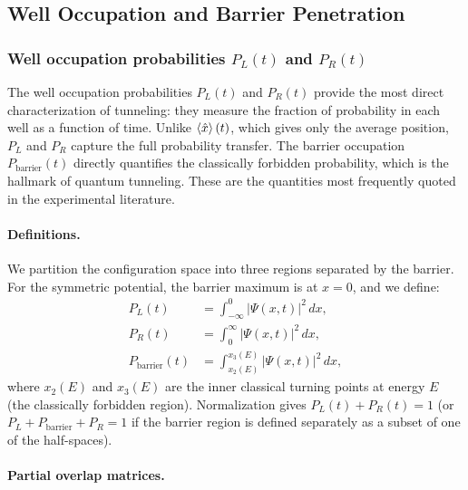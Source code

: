 \subsection{Well Occupation and Barrier Penetration}\label{sec:well_occupation}

\subsubsection{Well occupation probabilities $P_L(t)$ and $P_R(t)$}\label{sec:PLR}

\begin{remark}
The well occupation probabilities $P_L(t)$ and $P_R(t)$ provide the most direct characterization of tunneling: they measure the fraction of probability in each well as a function of time.
Unlike $\expval{\hat{x}}(t)$, which gives only the average position, $P_L$ and $P_R$ capture the full probability transfer.
The barrier occupation $P_{\text{barrier}}(t)$ directly quantifies the classically forbidden probability, which is the hallmark of quantum tunneling.
These are the quantities most frequently quoted in the experimental literature.
\end{remark}

\paragraph{Definitions.}

We partition the configuration space into three regions separated by the barrier.
For the symmetric potential, the barrier maximum is at $x = 0$, and we define:
\begin{align}
  P_L(t) &= \int_{-\infty}^{0} |\Psi(x,t)|^2\,dx, \label{eq:PL_def}\\
  P_R(t) &= \int_{0}^{\infty} |\Psi(x,t)|^2\,dx,\label{eq:PR_def}\\
  P_{\text{barrier}}(t) &= \int_{x_2(E)}^{x_3(E)} |\Psi(x,t)|^2\,dx,\label{eq:Pbar_def}
\end{align}
where $x_2(E)$ and $x_3(E)$ are the inner classical turning points at energy $E$ (the classically forbidden region).
Normalization gives $P_L(t) + P_R(t) = 1$ (or $P_L + P_{\text{barrier}} + P_R = 1$ if the barrier region is defined separately as a subset of one of the half-spaces).

\paragraph{Partial overlap matrices.}

